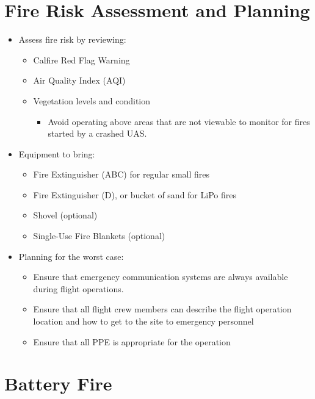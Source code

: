 \documentclass[
]{book}
\providecommand{\tightlist}{%
  \setlength{\itemsep}{0pt}\setlength{\parskip}{0pt}}
\begin{document}
\hypertarget{fire-risk-assessment-and-planning}{%
\section{Fire Risk Assessment and Planning}\label{fire-risk-assessment-and-planning}}

\begin{itemize}
\tightlist
\item
  Assess fire risk by reviewing:

  \begin{itemize}
  \tightlist
  \item
    Calfire Red Flag Warning
  \item
    Air Quality Index (AQI)
  \item
    Vegetation levels and condition

    \begin{itemize}
    \tightlist
    \item
      Avoid operating above areas that are not viewable to monitor for fires started by a crashed UAS.
    \end{itemize}
  \end{itemize}
\item
  Equipment to bring:

  \begin{itemize}
  \tightlist
  \item
    Fire Extinguisher (ABC) for regular small fires
  \item
    Fire Extinguisher (D), or bucket of sand for LiPo fires
  \item
    Shovel (optional)
  \item
    Single-Use Fire Blankets (optional)
  \end{itemize}
\item
  Planning for the worst case:

  \begin{itemize}
  \tightlist
  \item
    Ensure that emergency communication systems are always available during flight operations.
  \item
    Ensure that all flight crew members can describe the flight operation location and how to get to the site to emergency personnel
  \item
    Ensure that all PPE is appropriate for the operation
  \end{itemize}
\end{itemize}

\hypertarget{battery-fire}{%
\section{Battery Fire}\label{battery-fire}}
\end{document}
